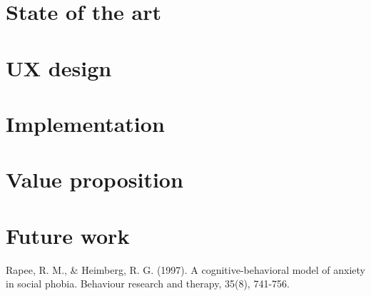 \documentclass[letterpaper,12pt]{article}
\begin{document}
\section{State of the art}
	
	\pagebreak
	
\section{UX design}
	\pagebreak
	
\section{Implementation}
	
	\pagebreak
	
\section{Value proposition}
	
	\pagebreak

\section{Future work}
	
	\pagebreak



\begin{thebibliography}{99}

Rapee, R. M., \& Heimberg, R. G. (1997). A cognitive-behavioral model of anxiety in social phobia. Behaviour research and therapy, 35(8), 741-756.

\end{thebibliography}
\end{document}
